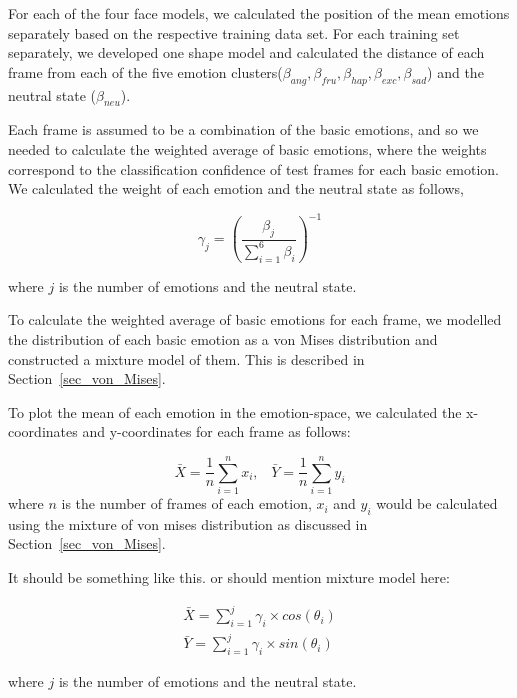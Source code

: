 \documentclass[10pt,journal,cspaper,compsoc]{IEEEtran}
\begin{document}
For each of the four face models, we calculated the position of the mean emotions separately based on the respective training data set. For each training set separately, we developed one shape model and calculated the distance of each frame from each of the five emotion clusters($\beta_{ang}, \beta_{fru}, \beta_{hap}, \beta_{exc}, \beta_{sad}$) and the neutral state ($\beta_{neu}$). 

Each frame is assumed to be a combination of the basic emotions, and so we needed to calculate the weighted average of basic emotions, where the weights correspond to the classification confidence of test frames for each basic emotion. We calculated the weight of each emotion and the neutral state as follows,

\begin{equation}
\gamma_{j}=\left(\frac{\beta_{j}}{\sum \limits_{i=1}^6 \beta_{i}} \right) ^{-1}
\label{eq_weights}
\end{equation}

where $j$ is the number of emotions and the neutral state.

To calculate the weighted average of basic emotions for each frame, we modelled the distribution of each basic emotion as a von Mises distribution and constructed a mixture model of them. This is described in Section~\ref{sec_von_Mises}.

To plot the mean of each emotion in the emotion-space, we calculated the x-coordinates and y-coordinates for each frame as follows:

\begin{equation}
\bar{X}=\frac{1}{n}\sum \limits_{i=1}^n x_{i}, \; \; \; \bar{Y}=\frac{1}{n}\sum \limits_{i=1}^n y_{i}
\end{equation}
where $n$ is the number of frames of each emotion, $x_{i}$ and $y_{i}$ would be calculated using the mixture of von mises distribution as discussed in Section~\ref{sec_von_Mises}.

It should be something like this. or should mention mixture model here:

\begin{equation}
\begin{array}{ll} 
\bar{X}=\sum \limits_{i=1}^j \gamma_{i} \times cos(\theta_{i}) \\
\bar{Y}=\sum \limits_{i=1}^j \gamma_{i} \times sin(\theta_{i})
\end{array}
\end{equation}

where $j$ is the number of emotions and the neutral state.
\end{document}
